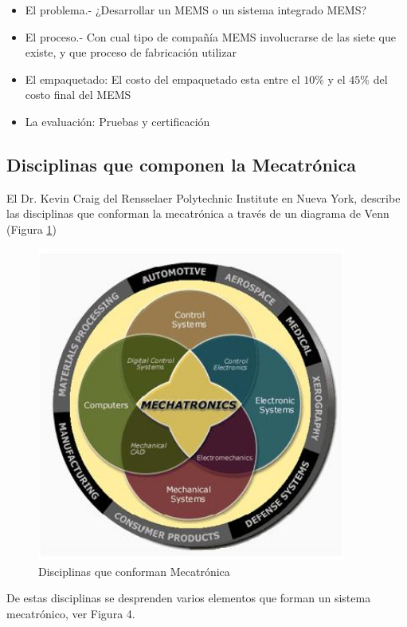 \documentclass[12pt]{book}
\theoremstyle{definition}
\theoremstyle{remark}
\theoremstyle{plain}
\begin{document}
\begin{itemize}
\item El problema.- ¿Desarrollar un MEMS o un sistema integrado MEMS?
\item El proceso.- Con cual tipo de compañía MEMS involucrarse de las siete que existe, y que proceso de fabricación utilizar
\item El empaquetado: El costo del empaquetado esta entre el $10\%$ y el $45\%$ del costo final del MEMS
\item La evaluación: Pruebas y certificación
\end{itemize}

\subsection{Disciplinas que componen la Mecatrónica}
El Dr. Kevin Craig del Rensselaer Polytechnic Institute en Nueva York, describe las disciplinas que conforman la mecatrónica a través de un diagrama de Venn (Figura \ref{fig003})

\begin{figure}
\centering
\includegraphics[width=4in]{mecatronica.jpg}
\caption{Disciplinas que conforman Mecatrónica}
\label{fig003}
\end{figure}

De estas disciplinas se desprenden varios elementos que forman un sistema mecatrónico, ver Figura 4.
\end{document}
